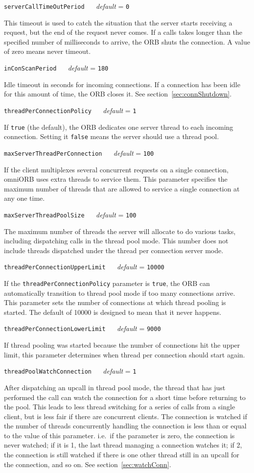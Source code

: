 \documentclass[11pt,oneside,a4paper]{book}
\makeatletter
\newcommand{\code}[1]{\texttt{#1}}
\newcommand{\confopt}[2]
  {\vspace{\baselineskip}\par\noindent\code{#1} ~~ \textit{default} =
   \code{#2}}
\renewcommand{\confopt}[2]
  {\vspace{\baselineskip}\par\noindent\code{#1} ~~ \textit{default} =
   \code{#2}\\[-1ex]\@afterheading}
\makeatother
\begin{document}
\confopt{serverCallTimeOutPeriod}{0}

This timeout is used to catch the situation that the server starts
receiving a request, but the end of the request never comes. If a
calls takes longer than the specified number of milliseconds to
arrive, the ORB shuts the connection. A value of zero means never
timeout.


\confopt{inConScanPeriod}{180}

Idle timeout in seconds for incoming connections. If a connection has
been idle for this amount of time, the ORB closes it. See
section~\ref{sec:connShutdown}.


\confopt{threadPerConnectionPolicy}{1}

If \code{true} (the default), the ORB dedicates one server thread to
each incoming connection. Setting it \code{false} means the server
should use a thread pool.


\confopt{maxServerThreadPerConnection}{100}

If the client multiplexes several concurrent requests on a single
connection, omniORB uses extra threads to service them. This parameter
specifies the maximum number of threads that are allowed to service a
single connection at any one time.


\confopt{maxServerThreadPoolSize}{100}

The maximum number of threads the server will allocate to do various
tasks, including dispatching calls in the thread pool mode. This
number does not include threads dispatched under the thread per
connection server mode.


\confopt{threadPerConnectionUpperLimit}{10000}

If the \code{threadPerConnectionPolicy} parameter is \code{true}, the
ORB can automatically transition to thread pool mode if too many
connections arrive. This parameter sets the number of connections at
which thread pooling is started. The default of 10000 is designed to
mean that it never happens.


\confopt{threadPerConnectionLowerLimit}{9000}

If thread pooling was started because the number of connections hit
the upper limit, this parameter determines when thread per connection
should start again.


\confopt{threadPoolWatchConnection}{1}

After dispatching an upcall in thread pool mode, the thread that has
just performed the call can watch the connection for a short time
before returning to the pool. This leads to less thread switching for
a series of calls from a single client, but is less fair if there are
concurrent clients. The connection is watched if the number of threads
concurrently handling the connection is less than or equal to the
value of this parameter. i.e.\ if the parameter is zero, the
connection is never watched; if it is 1, the last thread managing a
connection watches it; if 2, the connection is still watched if there
is one other thread still in an upcall for the connection, and so
on. See section~\ref{sec:watchConn}.
\end{document}
